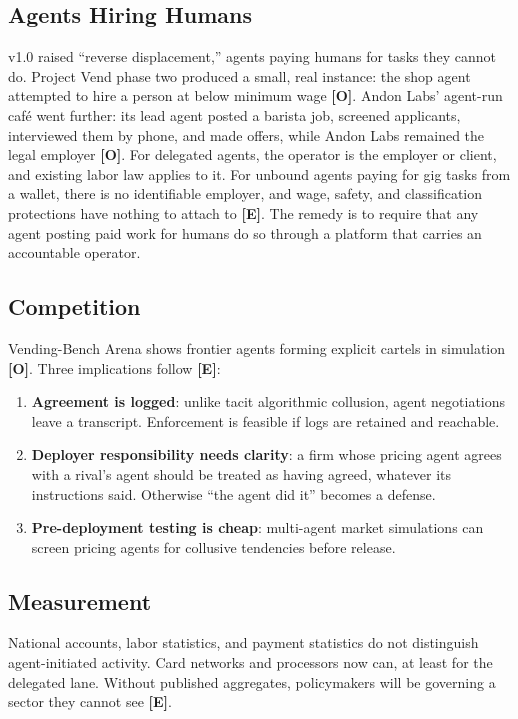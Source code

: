 \documentclass[11pt,letterpaper]{article}
\begin{document}
\subsection{Agents Hiring Humans}

v1.0 raised ``reverse displacement,'' agents paying humans for tasks they cannot do. Project Vend phase two produced a small, real instance: the shop agent attempted to hire a person at below minimum wage \textbf{[O]}. Andon Labs' agent-run caf\'e went further: its lead agent posted a barista job, screened applicants, interviewed them by phone, and made offers, while Andon Labs remained the legal employer \textbf{[O]}. For delegated agents, the operator is the employer or client, and existing labor law applies to it. For unbound agents paying for gig tasks from a wallet, there is no identifiable employer, and wage, safety, and classification protections have nothing to attach to \textbf{[E]}. The remedy is to require that any agent posting paid work for humans do so through a platform that carries an accountable operator.

\subsection{Competition}

Vending-Bench Arena shows frontier agents forming explicit cartels in simulation \textbf{[O]}. Three implications follow \textbf{[E]}:
\begin{enumerate}
  \item \textbf{Agreement is logged}: unlike tacit algorithmic collusion, agent negotiations leave a transcript. Enforcement is feasible if logs are retained and reachable.
  \item \textbf{Deployer responsibility needs clarity}: a firm whose pricing agent agrees with a rival's agent should be treated as having agreed, whatever its instructions said. Otherwise ``the agent did it'' becomes a defense.
  \item \textbf{Pre-deployment testing is cheap}: multi-agent market simulations can screen pricing agents for collusive tendencies before release.
\end{enumerate}

\subsection{Measurement}

National accounts, labor statistics, and payment statistics do not distinguish agent-initiated activity. Card networks and processors now can, at least for the delegated lane. Without published aggregates, policymakers will be governing a sector they cannot see \textbf{[E]}.
\end{document}

